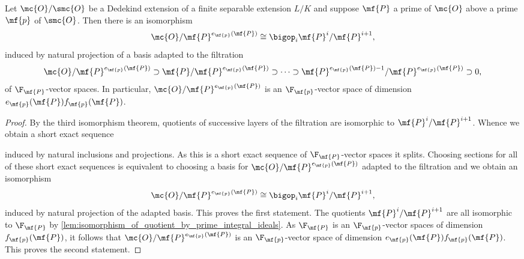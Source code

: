 \documentclass[12pt]{article}
\begin{document}
      \begin{lemma}\label{lem:prime_power_vector_space_isomorphism}
        Let \(\mc{O}/\smc{O}\) be a Dedekind extension of a finite separable extension \(L/K\) and suppose \(\mf{P}\) a prime of \(\mc{O}\) above a prime \(\mf{p}\) of \(\smc{O}\). Then there is an isomorphism
        \[
          \mc{O}/\mf{P}^{e_{\mf{p}}(\mf{P})} \cong \bigop_{i}\mf{P}^{i}/\mf{P}^{i+1},
        \]
        induced by natural projection of a basis adapted to the filtration
        \[
          \mc{O}/\mf{P}^{e_{\mf{p}}(\mf{P})} \supset \mf{P}/\mf{P}^{e_{\mf{p}}(\mf{P})} \supset \cdots \supset \mf{P}^{e_{\mf{p}}(\mf{P})-1}/\mf{P}^{e_{\mf{p}}(\mf{P})} \supset 0,
        \]
        of \(\F_{\mf{P}}\)-vector spaces. In particular, \(\mc{O}/\mf{P}^{e_{\mf{p}}(\mf{P})}\) is an \(\F_{\mf{p}}\)-vector space of dimension \(e_{\mf{p}}(\mf{P})f_{\mf{p}}(\mf{P})\).
      \end{lemma}
      \begin{proof}
        By the third isomorphism theorem, quotients of successive layers of the filtration are isomorphic to \(\mf{P}^{i}/\mf{P}^{i+1}\). Whence we obtain a short exact sequence
        \begin{center}
        \end{center}
        induced by natural inclusions and projections. As this is a short exact sequence of \(\F_{\mf{P}}\)-vector spaces it splits. Choosing sections for all of these short exact sequences is equivalent to choosing a basis for \(\mc{O}/\mf{P}^{e_{\mf{p}}(\mf{P})}\) adapted to the filtration and we obtain an isomorphism
        \[
          \mc{O}/\mf{P}^{e_{\mf{p}}(\mf{P})} \cong \bigop_{i}\mf{P}^{i}/\mf{P}^{i+1},
        \]
        induced by natural projection of the adapted basis. This proves the first statement. The quotients \(\mf{P}^{i}/\mf{P}^{i+1}\) are all isomorphic to \(\F_{\mf{P}}\) by \cref{lem:isomorphism_of_quotient_by_prime_integral_ideals}. As \(\F_{\mf{P}}\) is an \(\F_{\mf{p}}\)-vector spaces of dimension \(f_{\mf{p}}(\mf{P})\), it follows that \(\mc{O}/\mf{P}^{e_{\mf{p}}(\mf{P})}\) is an \(\F_{\mf{p}}\)-vector space of dimension \(e_{\mf{p}}(\mf{P})f_{\mf{p}}(\mf{P})\). This proves the second statement.
      \end{proof}
      
\end{document}
